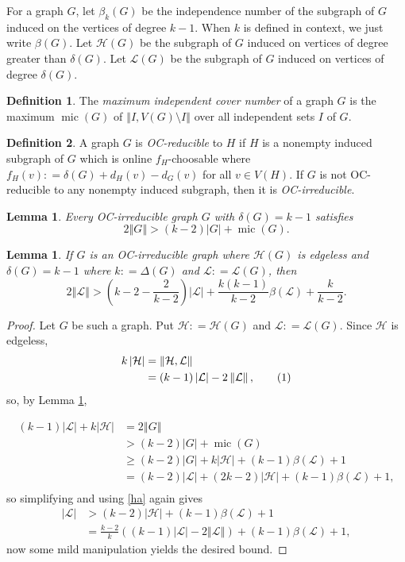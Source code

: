 \documentclass[12pt]{article}
\title{}
\author{}
\theoremstyle{plain}
\newtheorem{lem}[thm]{Lemma}
\theoremstyle{definition}
\newtheorem{defn}{Definition}
\theoremstyle{remark}
\newcommand{\fancy}[1]{\mathcal{#1}}
\renewcommand{\L}{\fancy{L}}
\newcommand{\HH}{\fancy{H}}
\newcommand{\card}[1]{\left|#1\right|}
\newcommand{\size}[1]{\left\Vert#1\right\Vert}
\newcommand{\parens}[1]{\left( #1 \right)}
\newcommand{\DefinedAs}{\mathrel{\mathop:}=}
\newcommand{\mic}{\operatorname{mic}}
\newcommand\numberthis{\addtocounter{equation}{1}\tag{\theequation}}
\begin{document}
\maketitle

For a graph $G$, let $\beta_k(G)$ be the independence number of the subgraph of $G$ induced on the vertices of degree $k-1$.  
When $k$ is defined in context, we just write $\beta(G)$.  Let $\HH(G)$ be the subgraph of $G$ induced on vertices of degree greater than $\delta(G)$.
Let $\L(G)$ be the subgraph of $G$ induced on vertices of degree $\delta(G)$.
\begin{defn} The \emph{maximum independent cover number }of a graph $G$
	is the maximum $\mic(G)$ of $\size{I, V(G) \setminus I}$ over all independent sets $I$
	of $G$. 
\end{defn}

\begin{defn} A graph $G$ is \emph{OC-reducible} to $H$ if $H$ is a nonempty induced
subgraph of $G$ which is online $f_{H}$-choosable where $f_{H}(v)\DefinedAs\delta(G)+d_{H}(v)-d_{G}(v)$
for all $v\in V(H)$. If $G$ is not OC-reducible to any nonempty induced subgraph,
then it is \emph{OC-irreducible}. 
\end{defn}

\begin{lem}\label{ConsantListMicStrength} 
	Every OC-irreducible graph $G$ with $\delta(G) = k-1$ satisfies
	\[2\size{G} > (k-2)\card{G} + \mic(G).\]
\end{lem}

\begin{lem}\label{LBound}
If $G$ is an OC-irreducible graph where $\HH(G)$ is edgeless and $\delta(G) = k - 1$ where $k \DefinedAs \Delta(G)$ and $\L\DefinedAs\L(G)$, then
\[2\size{\L} > \parens{k-2 - \frac{2}{k-2}}\card{\L} + \frac{k(k-1)}{k-2}\beta(\L) + \frac{k}{k-2}.\]
\end{lem}
\begin{proof}
Let $G$ be such a graph. Put $\HH \DefinedAs \HH(G)$ and $\L \DefinedAs \L(G)$.  Since
$\HH$ is edgeless,
\begin{align*}
k\card{\HH}&= \size{\HH, \L}\\
&=(k-1)\card{\L} - 2\size{\L},\numberthis \label{ha}\\
\end{align*}
so, by Lemma \ref{ConsantListMicStrength},

\begin{align*}
(k-1)\card{\L} + k\card{\HH} &= 2\size{G}\\
&> (k-2)\card{G} + \mic(G) \\
&\ge (k-2)\card{G} + k\card{\HH} + (k-1)\beta(\L) + 1\\
&= (k-2)\card{\L} + (2k-2)\card{\HH} + (k-1)\beta(\L) + 1,\\
\end{align*}
so simplifying and using \eqref{ha} again gives
\begin{align*}
\card{\L} &> (k-2)\card{\HH} + (k-1)\beta(\L) + 1\\
&= \frac{k-2}{k}\parens{(k-1)\card{\L} - 2\size{\L}} + (k-1)\beta(\L) + 1,
\end{align*}
now some mild manipulation yields the desired bound. 
\end{proof}
\end{document}
